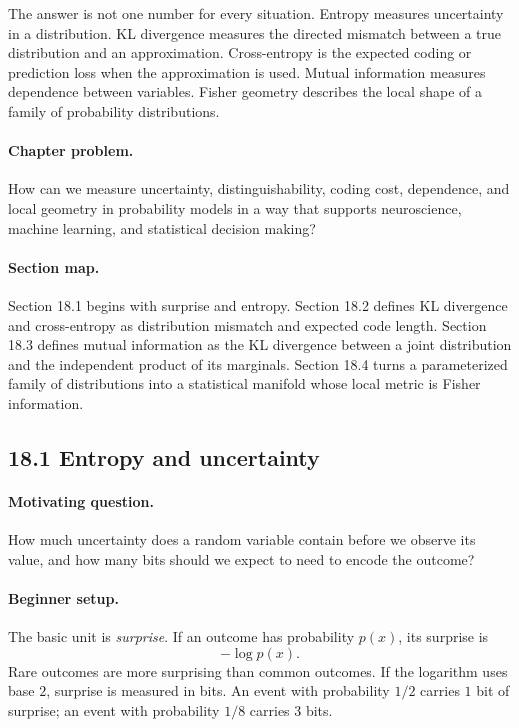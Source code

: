 The answer is not one number for every situation. Entropy measures uncertainty in a distribution. KL divergence measures the directed mismatch between a true distribution and an approximation. Cross-entropy is the expected coding or prediction loss when the approximation is used. Mutual information measures dependence between variables. Fisher geometry describes the local shape of a family of probability distributions.

\paragraph{Chapter problem.}
How can we measure uncertainty, distinguishability, coding cost, dependence, and local geometry in probability models in a way that supports neuroscience, machine learning, and statistical decision making?

\paragraph{Section map.}
Section 18.1 begins with surprise and entropy. Section 18.2 defines KL divergence and cross-entropy as distribution mismatch and expected code length. Section 18.3 defines mutual information as the KL divergence between a joint distribution and the independent product of its marginals. Section 18.4 turns a parameterized family of distributions into a statistical manifold whose local metric is Fisher information.

\subsection{18.1 Entropy and uncertainty}

\paragraph{Motivating question.}
How much uncertainty does a random variable contain before we observe its value, and how many bits should we expect to need to encode the outcome?

\paragraph{Beginner setup.}
The basic unit is \emph{surprise}. If an outcome has probability \(p(x)\), its surprise is
\[
 -\log p(x).
\]
Rare outcomes are more surprising than common outcomes. If the logarithm uses base \(2\), surprise is measured in bits. An event with probability \(1/2\) carries \(1\) bit of surprise; an event with probability \(1/8\) carries \(3\) bits.

